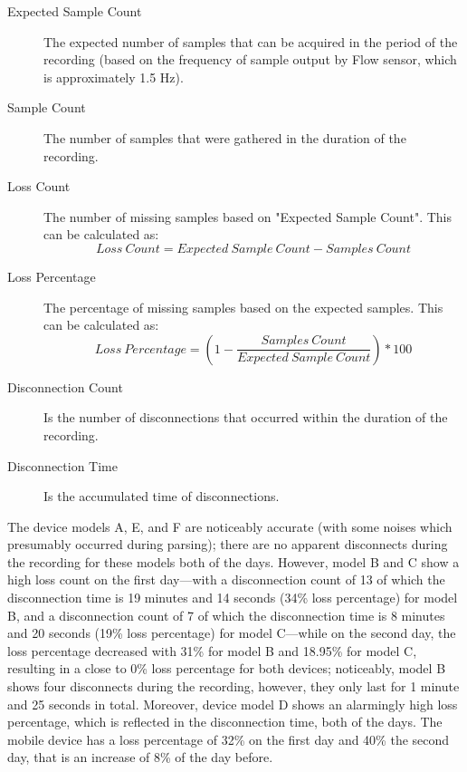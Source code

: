 \begin{description}
    \item[Expected Sample Count] The expected number of samples that can be acquired in the period of the recording (based on the frequency of sample output by Flow sensor, which is approximately 1.5 Hz).
    \item[Sample Count] The number of samples that were gathered in the duration of the recording. 
    \item[Loss Count] The number of missing samples based on "Expected Sample Count". This can be calculated as: 
\begin{equation} \label{losscount}
Loss\ Count = Expected\ Sample\ Count - Samples\ Count
\end{equation}
    \item[Loss Percentage] The percentage of missing samples based on the expected samples. This can be calculated as:
\begin{equation} \label{losscount}
Loss\ Percentage = (1 - \frac{Samples\ Count}{Expected\ Sample\ Count}) * 100
\end{equation}
    \item[Disconnection Count] Is the number of disconnections that occurred within the duration of the recording.
    \item[Disconnection Time] Is the accumulated time of disconnections. 
\end{description}

The device models A, E, and F are noticeably accurate (with some noises which presumably occurred during parsing); there are no apparent disconnects during the recording for these models both of the days. However, model B and C show a high loss count on the first day---with a disconnection count of 13 of which the disconnection time is 19 minutes and 14 seconds (34\% loss percentage) for model B, and a disconnection count of 7 of which the disconnection time is 8 minutes and 20 seconds (19\% loss percentage) for model C---while on the second day, the loss percentage decreased with 31\% for model B and 18.95\% for model C, resulting in a close to  0\% loss percentage for both devices; noticeably, model B shows four disconnects during the recording, however, they only last for 1 minute and 25 seconds in total. Moreover, device model D shows an alarmingly high loss percentage, which is reflected in the disconnection time, both of the days. The mobile device has a loss percentage of 32\% on the first day and 40\% the second day, that is an increase of 8\% of the day before. 

